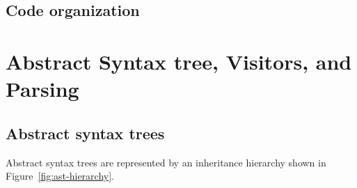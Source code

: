 \documentclass[11pt,a4paper]{scrartcl}
\begin{document}
\subsection{Code organization}

\newpage

\section{Abstract Syntax tree, Visitors, and Parsing}

\subsection{Abstract syntax trees}

Abstract syntax trees are represented by an inheritance hierarchy shown in Figure~\ref{fig:ast-hierarchy}.
\end{document}
